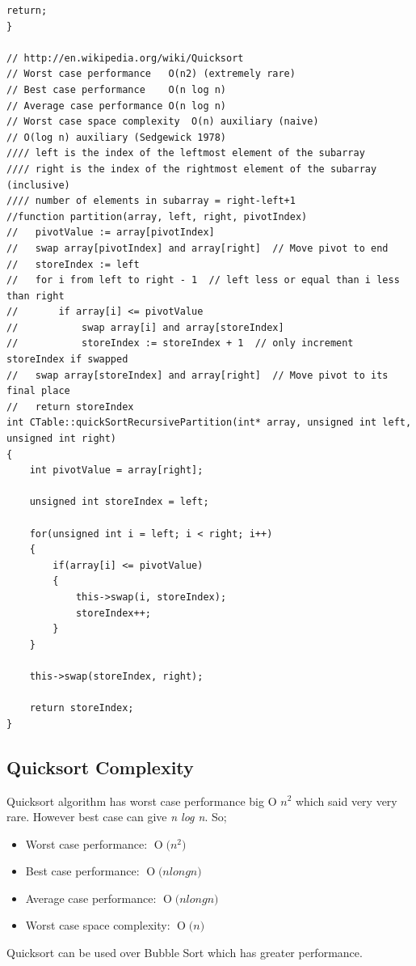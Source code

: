 \documentclass{article}
\newcommand{\BigO}[1]{\ensuremath{\operatorname{O}\bigl(#1\bigr)}}
\begin{document}
\begin{lstlisting}[label=CTable-quicksort, caption=Quick Sort]
    return;
}

// http://en.wikipedia.org/wiki/Quicksort
// Worst case performance	O(n2) (extremely rare)
// Best case performance	O(n log n)
// Average case performance	O(n log n)
// Worst case space complexity	O(n) auxiliary (naive)
// O(log n) auxiliary (Sedgewick 1978)
//// left is the index of the leftmost element of the subarray
//// right is the index of the rightmost element of the subarray (inclusive)
//// number of elements in subarray = right-left+1
//function partition(array, left, right, pivotIndex)
//   pivotValue := array[pivotIndex]
//   swap array[pivotIndex] and array[right]  // Move pivot to end
//   storeIndex := left
//   for i from left to right - 1  // left less or equal than i less than right
//       if array[i] <= pivotValue
//           swap array[i] and array[storeIndex]
//           storeIndex := storeIndex + 1  // only increment storeIndex if swapped
//   swap array[storeIndex] and array[right]  // Move pivot to its final place
//   return storeIndex
int CTable::quickSortRecursivePartition(int* array, unsigned int left, unsigned int right)
{
    int pivotValue = array[right];

    unsigned int storeIndex = left;

    for(unsigned int i = left; i < right; i++)
    {
        if(array[i] <= pivotValue)
        {
            this->swap(i, storeIndex);
            storeIndex++;
        }
    }

    this->swap(storeIndex, right);

    return storeIndex;
}

	\end{lstlisting}



	\subsection{Quicksort Complexity}
	Quicksort algorithm has worst case performance big O \emph{$n^{2}$} which said very very rare. However best case can give \emph{n log n}. So;
	\begin{itemize}
	\item Worst case performance: \BigO{n^{2}}
	\item Best case performance: \BigO{n long n}
	\item Average case performance: \BigO{n long n}
	\item Worst case space complexity: \BigO{n}
	\end{itemize}
	Quicksort can be used over Bubble Sort which has greater performance.
	
\end{document}
